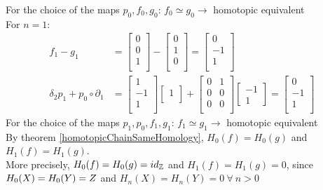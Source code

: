 \documentclass[11pt,a4paper]{report}
\begin{document}
\begin{Ex}
         For the choice of the maps $p_0, f_0, g_0$: $f_0 \simeq g_0 \rightarrow$ homotopic equivalent \\
         For $n = 1$:
           \begin{align*}
            f_1 - g_1 &= \begin{bmatrix} 0 \\
                            0  \\
                            1 \\  \end{bmatrix} -
            \begin{bmatrix} 0 \\
                            1  \\
                            0 \\ \end{bmatrix} =
                            \begin{bmatrix}0 \\
                            -1 \\
                            1 \\ \end{bmatrix} \\
           \delta_{2}p_1 + p_0 \circ \partial_1 &= \begin{bmatrix} 1  \\
                            -1 \\
                            1 \\  \end{bmatrix} \begin{bmatrix} 1 \\ \end{bmatrix}
                            + \begin{bmatrix} 0 & 1 \\ 0 & 0 \\ 0 & 0 \\   \end{bmatrix} \begin{bmatrix} -1 \\ 1 \end{bmatrix}
                            = \begin{bmatrix} 0 \\
                            -1 \\
                            1 \\\end{bmatrix}
            \end{align*}
             For the choice of the maps $p_1, p_0, f_1, g_1$: $f_1 \simeq g_1 \rightarrow$ homotopic equivalent \\
             By theorem \ref{homotopicChainSameHomology}, $H_0(f) = H_0(g)$ and $H_1(f) = H_1(g)$. \\
             More precisely, $H_0(f) = H_0(g) = id_{\mathbb{Z}}$ and $H_1(f) = H_1(g) = 0$, since
             $H_0(X) = H_0(Y) = \\Z$ and $H_n(X) = H_n(Y) = 0 \ \forall \ n > 0$
        \end{Ex}
\end{document}
